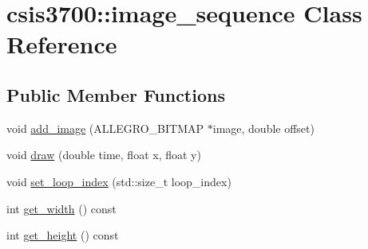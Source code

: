 \hypertarget{classcsis3700_1_1image__sequence}{\section{csis3700\-:\-:image\-\_\-sequence Class Reference}
\label{classcsis3700_1_1image__sequence}
}
\subsection*{Public Member Functions}
\begin{DoxyCompactItemize}
\item 
void \hyperlink{classcsis3700_1_1image__sequence_aa8c137829b803075fccc0d2549b0df95}{add\-\_\-image} (A\-L\-L\-E\-G\-R\-O\-\_\-\-B\-I\-T\-M\-A\-P $\ast$image, double offset)
\item 
void \hyperlink{classcsis3700_1_1image__sequence_a4a7dadd01b965db2052439584171f7a6}{draw} (double time, float x, float y)
\item 
void \hyperlink{classcsis3700_1_1image__sequence_aa1a83d01babd833a16ac89759a4e0a57}{set\-\_\-loop\-\_\-index} (std\-::size\-\_\-t loop\-\_\-index)
\item 
int \hyperlink{classcsis3700_1_1image__sequence_adbd7345e70b84e0712c980fc862040c5}{get\-\_\-width} () const 
\item 
int \hyperlink{classcsis3700_1_1image__sequence_ad29fb3a6705095bc92223ff565bbc1cf}{get\-\_\-height} () const 
\end{DoxyCompactItemize}


